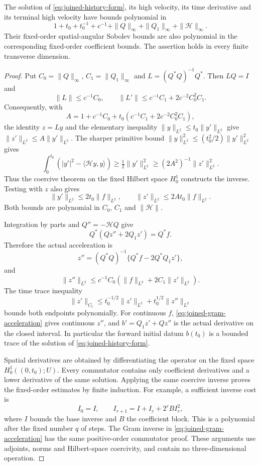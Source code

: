 \begin{lemma}\label{lem:joined-history-polynomial}
The solution of \eqref{eq:joined-history-form}, its high velocity,
its time derivative and its terminal high velocity have bounds
polynomial in
\[
 1+t_0+t_0^{-1}+c^{-1}+
 \|Q\|_\infty+\|Q_1\|_\infty+\|\mathcal H\|_\infty .
\]
Their fixed-order spatial-angular Sobolev bounds are also polynomial in
the corresponding fixed-order coefficient bounds. The assertion holds
in every finite transverse dimension.
\end{lemma}
\begin{proof}
Put $C_0=\|Q\|_\infty$, $C_1=\|Q_1\|_\infty$ and
$L=(Q^*Q)^{-1}Q^*$. Then $LQ=I$ and
\[
 \|L\|\leq c^{-1}C_0,\qquad
 \|L'\|\leq c^{-1}C_1+2c^{-2}C_0^2C_1.
\]
Consequently, with
\[
 A=1+c^{-1}C_0+
       t_0(c^{-1}C_1+2c^{-2}C_0^2C_1),
\]
the identity $z=Ly$ and the elementary inequality
$\|y\|_{L^2}\leq t_0\|y'\|_{L^2}$ give
$\|z'\|_{L^2}\leq A\|y'\|_{L^2}$.
The sharper primitive bound
$\|y\|_{L^2}^2\leq(t_0^2/2)\|y'\|_{L^2}^2$ gives
\[
 \int_0^{t_0}(|y'|^2-\langle\mathcal Hy,y\rangle)
 \geq\tfrac12\|y'\|_{L^2}^2
 \geq(2A^2)^{-1}\|z'\|_{L^2}^2.
\]
Thus the coercive theorem on the fixed Hilbert space $H^1_0$ constructs
the inverse. Testing with $z$ also gives
\[
 \|y'\|_{L^2}\leq2t_0\|f\|_{L^2},\qquad
 \|z'\|_{L^2}\leq2At_0\|f\|_{L^2}.
\]
Both bounds are polynomial in $C_0$, $C_1$ and $\|\mathcal H\|$.

Integration by parts and $Q''=-\mathcal HQ$ give
\[
 Q^*(Qz''+2Q_1z')=Q^*f.
\]
Therefore the actual acceleration is
\begin{equation}\label{eq:joined-gram-acceleration}
 z''=(Q^*Q)^{-1}\{Q^*f-2Q^*Q_1z'\},
\end{equation}
and
\[
 \|z''\|_{L^2}\leq
 c^{-1}C_0(\|f\|_{L^2}+2C_1\|z'\|_{L^2}).
\]
The time trace inequality
\[
 \|z'\|_{C_t}\leq
 t_0^{-1/2}\|z'\|_{L^2}+t_0^{1/2}\|z''\|_{L^2}
\]
bounds both endpoints polynomially. For continuous $f$,
\eqref{eq:joined-gram-acceleration} gives continuous $z''$, and
$b'=Q_1z'+Qz''$ is the actual derivative on the closed interval.
In particular the forward initial datum $b(t_0)$ is a bounded trace
of the solution of \eqref{eq:joined-history-form}.

Spatial derivatives are obtained by differentiating the operator on
the fixed space $H^1_0((0,t_0);U)$. Every commutator contains only
coefficient derivatives and a lower derivative of the same solution.
Applying the same coercive inverse proves the fixed-order estimates
by finite induction. For example, a sufficient inverse cost is
\[
 I_0=I,\qquad I_{r+1}=I+I_r+2^rB I_r^2,
\]
where $I$ bounds the base inverse and $B$ the coefficient block.
This is a polynomial after the fixed number $q$ of steps.
The Gram inverse in \eqref{eq:joined-gram-acceleration} has the same
positive-order commutator proof. These arguments use adjoints, norms
and Hilbert-space coercivity, and contain no three-dimensional operation.
\end{proof}

